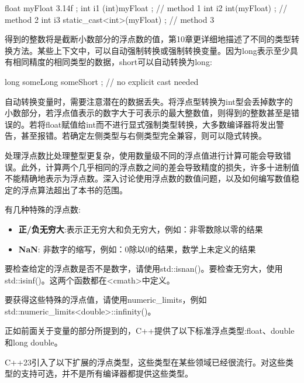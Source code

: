 \begin{cpp}
float myFloat { 3.14f };
int i1 { (int)myFloat }; // method 1
int i2 { int(myFloat) }; // method 2
int i3 { static_cast<int>(myFloat) }; // method 3
\end{cpp}

得到的整数将是截断小数部分的浮点数的值，第10章更详细地描述了不同的类型转换方法。某些上下文中，可以自动强制转换或强制转换变量。因为long表示至少具有相同精度的相同类型的数据，short可以自动转换为long:

\begin{cpp}
long someLong { someShort }; // no explicit cast needed
\end{cpp}

自动转换变量时，需要注意潜在的数据丢失。将浮点型转换为int型会丢掉数字的小数部分，若浮点值表示的数字大于可表示的最大整数值，则得到的整数甚至是错误的。若将float赋值给int而不进行显式强制类型转换，大多数编译器将发出警告，甚至报错。若确定左侧类型与右侧类型完全兼容，则可以隐式转换。


处理浮点数比处理整型更复杂，使用数量级不同的浮点值进行计算可能会导致错误。此外，计算两个几乎相同的浮点数之间的差会导致精度的损失，许多十进制值不能精确地表示为浮点数。深入讨论使用浮点数的数值问题，以及如何编写数值稳定的浮点算法超出了本书的范围。

有几种特殊的浮点数:

\begin{itemize}
\item
\textbf{正/负无穷大}:表示正无穷大和负无穷大，例如：非零数除以零的结果

\item
\textbf{NaN}: 非数字的缩写，例如：0除以0的结果，数学上未定义的结果
\end{itemize}

要检查给定的浮点数是否不是数字，请使用std::isnan()。要检查无穷大，使用std::isinf()。这两个函数都在<cmath>中定义。

要获得这些特殊的浮点值，请使用numeric\_limits，例如std::numeric\_limits<double>::infinity()。



正如前面关于变量的部分所提到的，C++提供了以下标准浮点类型:float、double和long double。

C++23引入了以下扩展的浮点类型，这些类型在某些领域已经很流行。对这些类型的支持可选，并不是所有编译器都提供这些类型。

